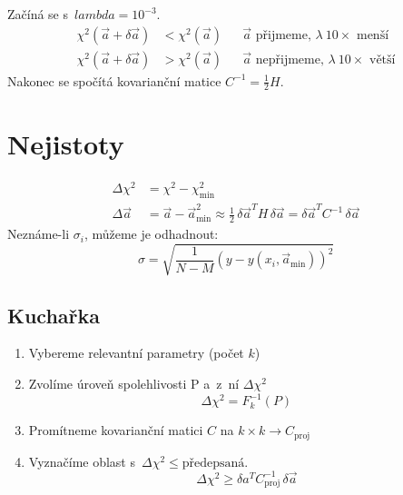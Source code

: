 \documentclass[a4paper]{article}
\begin{document}
Začíná se s~$lambda = 10^{-3}$.
\begin{align}
    \chi^2 (\vec{a} + \delta\vec{a}) &< \chi^2(\vec{a})
    & &\text{$\vec{a}$ přijmeme, $\lambda\ 10\times$ menší} \\
    \chi^2 (\vec{a} + \delta\vec{a}) &> \chi^2(\vec{a})
    & &\text{$\vec{a}$ nepřijmeme, $\lambda\ 10\times$ větší}
\end{align}
Nakonec se spočítá kovarianční matice $C^{-1} = \frac{1}{2} H$.

\section{Nejistoty}
\begin{align}
    \Delta\chi^2 &= \chi^2 - \chi_\text{min}^2 \\
    \Delta\vec{a} &= \vec{a} - \vec{a}_\text{min}^2
    \approx \frac{1}{2}\,\delta\vec{a}^T H \,\delta\vec{a}
    = \delta\vec{a}^T C^{-1} \,\delta\vec{a}
\end{align}
Neznáme-li $\sigma_i$, můžeme je odhadnout:
\begin{equation}
    \sigma = \sqrt{\frac{1}{N - M}(y - y(x_i, \vec{a}_\text{min}))^2}
\end{equation}

\subsection{Kuchařka}
\begin{enumerate}
    \item Vybereme relevantní parametry (počet $k$)
    \item Zvolíme úroveň spolehlivosti P a~z~ní $\Delta{\chi^2}$
    \begin{equation}
        \Delta\chi^2 = F_k^{-1}(P)
    \end{equation}
    \item Promítneme kovarianční matici $C$
    na $k \times k \rightarrow C_\text{proj}$
    \item Vyznačíme oblast s~$\Delta\chi^2 \leq \text{předepsaná}$.
    \begin{equation}
        \Delta\chi^2 \geq \delta a^T C_\text{proj}^{-1} \, \delta\vec{a}
    \end{equation}
\end{enumerate}
\end{document}

